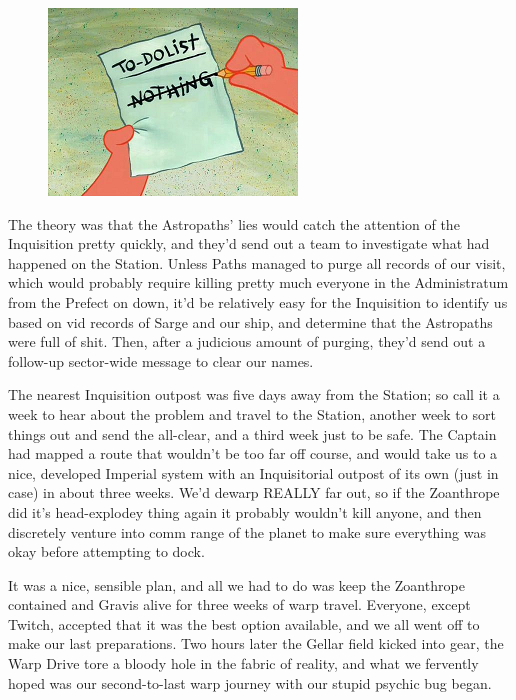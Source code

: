 \begin{figure}
	\begin{center}
		\includegraphics[width=\figwidth]{pics/15/6.png}
	\end{center}
\end{figure}
The theory was that the Astropaths' lies would catch the attention of the Inquisition pretty quickly, and they'd send out a team to investigate what had happened on the Station. 
Unless Paths managed to purge all records of our visit, which would probably require killing pretty much everyone in the Administratum from the Prefect on down, it'd be relatively easy for the Inquisition to identify us based on vid records of Sarge and our ship, and determine that the Astropaths were full of shit. 
Then, after a judicious amount of purging, they'd send out a follow-up sector-wide message to clear our names.

The nearest Inquisition outpost was five days away from the Station; 
so call it a week to hear about the problem and travel to the Station, another week to sort things out and send the all-clear, and a third week just to be safe. 
The Captain had mapped a route that wouldn't be too far off course, and would take us to a nice, developed Imperial system with an Inquisitorial outpost of its own (just in case) in about three weeks. 
We'd dewarp REALLY far out, so if the Zoanthrope did it's head-explodey thing again it probably wouldn't kill anyone, and then discretely venture into comm range of the planet to make sure everything was okay before attempting to dock.

It was a nice, sensible plan, and all we had to do was keep the Zoanthrope contained and Gravis alive for three weeks of warp travel. 
Everyone, except Twitch, accepted that it was the best option available, and we all went off to make our last preparations. 
Two hours later the Gellar field kicked into gear, the Warp Drive tore a bloody hole in the fabric of reality, and what we fervently hoped was our second-to-last warp journey with our stupid psychic bug began. 


